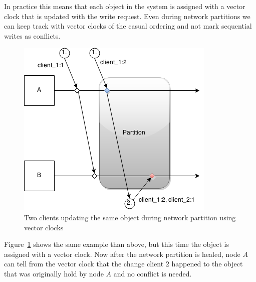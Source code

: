 In practice this means that each object in the system is assigned with a vector
clock that is updated with the write request. Even during network partitions we
can keep track with vector clocks of the casual ordering and not mark sequential
writes as conflicts.

\begin{figure}[h!]
  \centering
    \includegraphics[scale=0.7]{pictures/apexample_clocks.png}
  \caption{Two clients updating the same object during network partition using
  vector clocks}
\label{ap-example-clocks}
\end{figure}

Figure~\ref{ap-example-clocks} shows the same example than above, but this time
the object is assigned with a vector clock. Now after the network partition is
healed, node \(A\) can tell from the vector clock that the change client \(2\)
happened to the object that was originally hold by node \(A\) and no conflict is
needed.

